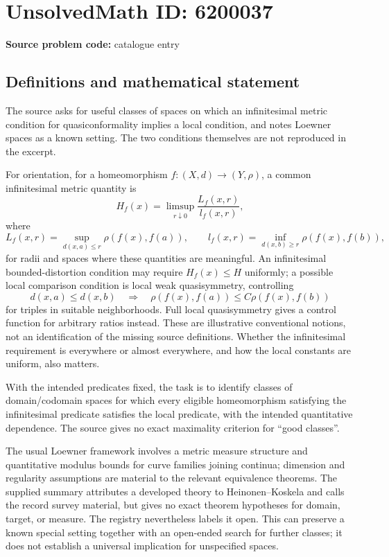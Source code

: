 \documentclass[11pt]{article}
\begin{document}
\section*{UnsolvedMath ID: 6200037}
\textbf{Source problem code:} catalogue entry
\subsection{Definitions and mathematical statement}
The source asks for useful classes of spaces on which an infinitesimal metric condition for quasiconformality implies a local condition, and notes Loewner spaces as a known setting. The two conditions themselves are not reproduced in the excerpt.

For orientation, for a homeomorphism \(f:(X,d)\to(Y,\rho)\), a common infinitesimal metric quantity is
\[
 H_f(x)=\limsup_{r\downarrow0}\frac{L_f(x,r)}{l_f(x,r)},
\]
where
\[
 L_f(x,r)=\sup_{d(x,a)\le r}\rho(f(x),f(a)),\qquad
 l_f(x,r)=\inf_{d(x,b)\ge r}\rho(f(x),f(b)),
\]
for radii and spaces where these quantities are meaningful. An infinitesimal bounded-distortion condition may require \(H_f(x)\le H\) uniformly; a possible local comparison condition is local weak quasisymmetry, controlling
\[
 d(x,a)\le d(x,b)\quad\Longrightarrow\quad
 \rho(f(x),f(a))\le C\rho(f(x),f(b))
\]
for triples in suitable neighborhoods. Full local quasisymmetry gives a control function for arbitrary ratios instead. These are illustrative conventional notions, not an identification of the missing source definitions. Whether the infinitesimal requirement is everywhere or almost everywhere, and how the local constants are uniform, also matters.

With the intended predicates fixed, the task is to identify classes of domain/codomain spaces for which every eligible homeomorphism satisfying the infinitesimal predicate satisfies the local predicate, with the intended quantitative dependence. The source gives no exact maximality criterion for ``good classes''.

The usual Loewner framework involves a metric measure structure and quantitative modulus bounds for curve families joining continua; dimension and regularity assumptions are material to the relevant equivalence theorems. The supplied summary attributes a developed theory to Heinonen--Koskela and calls the record survey material, but gives no exact theorem hypotheses for domain, target, or measure. The registry nevertheless labels it open. This can preserve a known special setting together with an open-ended search for further classes; it does not establish a universal implication for unspecified spaces.
\end{document}

